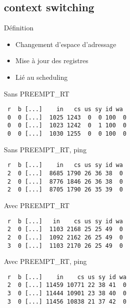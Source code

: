 \subsection{context switching}
\begin{frame}
	\begin{block}{Définition}
		\begin{itemize}
			\item Changement d'espace d'adressage
			\item Mise à jour des registres
			\item Lié au scheduling
		\end{itemize}
	\end{block}
\end{frame}
\begin{frame}[containsverbatim]
	\begin{block}{Sans PREEMPT\_RT}
\begin{verbatim}
 r  b [...]    in   cs us sy id wa
 0  0 [...]  1025 1243  0  0 100  0
 0  0 [...]  1023 1242  0  1 100  0
 0  0 [...]  1030 1255  0  0 100  0
\end{verbatim}
	\end{block}
	\begin{block}{Sans PREEMPT\_RT, ping}
\begin{verbatim}
 r  b [...]    in   cs us sy id wa
 2  0 [...]  8685 1790 26 36 38  0
 2  0 [...]  8776 1846 26 36 38  0
 2  0 [...]  8705 1790 26 35 39  0
\end{verbatim}
	\end{block}
\end{frame}

\begin{frame}[containsverbatim]
	\begin{block}{Avec PREEMPT\_RT}
\begin{verbatim}
 r  b [...]   in    cs us sy id wa
 2  0 [...]  1103 2168 25 25 49  0
 2  0 [...]  1092 2162 26 25 49  0
 3  0 [...]  1103 2170 26 25 49  0
\end{verbatim}
	\end{block}
	\begin{block}{Avec PREEMPT\_RT, ping}
\begin{verbatim}
 r  b [...]    in    cs us sy id wa
 2  0 [...] 11459 10771 22 38 41  0
 3  0 [...] 11444 10901 23 38 40  0
 3  0 [...] 11456 10838 21 37 42  0
\end{verbatim}
	\end{block}
\end{frame}


